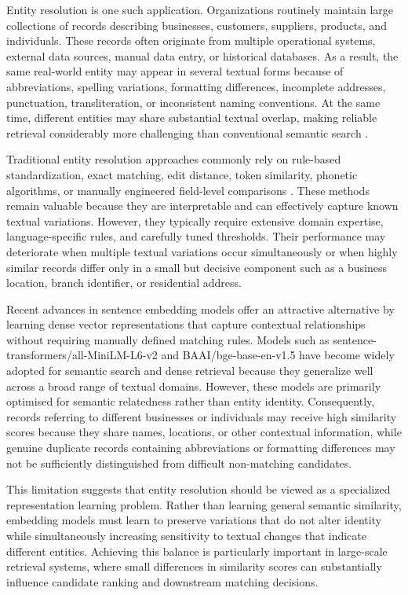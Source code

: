 \documentclass{article}
\begin{document}
Entity resolution is one such application. Organizations routinely maintain large collections of records describing businesses, customers, suppliers, products, and individuals. These records often originate from multiple operational systems, external data sources, manual data entry, or historical databases. As a result, the same real-world entity may appear in several textual forms because of abbreviations, spelling variations, formatting differences, incomplete addresses, punctuation, transliteration, or inconsistent naming conventions. At the same time, different entities may share substantial textual overlap, making reliable retrieval considerably more challenging than conventional semantic search \citep{christen2012}.

Traditional entity resolution approaches commonly rely on rule-based standardization, exact matching, edit distance, token similarity, phonetic algorithms, or manually engineered field-level comparisons \citep{christen2012,elmagarmid2007}. These methods remain valuable because they are interpretable and can effectively capture known textual variations. However, they typically require extensive domain expertise, language-specific rules, and carefully tuned thresholds. Their performance may deteriorate when multiple textual variations occur simultaneously or when highly similar records differ only in a small but decisive component such as a business location, branch identifier, or residential address.

Recent advances in sentence embedding models \citep{reimers2019,xiao2023} offer an attractive alternative by learning dense vector representations that capture contextual relationships without requiring manually defined matching rules. Models such as sentence-transformers/all-MiniLM-L6-v2 and BAAI/bge-base-en-v1.5 have become widely adopted for semantic search and dense retrieval because they generalize well across a broad range of textual domains. However, these models are primarily optimised for semantic relatedness rather than entity identity. Consequently, records referring to different businesses or individuals may receive high similarity scores because they share names, locations, or other contextual information, while genuine duplicate records containing abbreviations or formatting differences may not be sufficiently distinguished from difficult non-matching candidates.

This limitation suggests that entity resolution should be viewed as a specialized representation learning problem. Rather than learning general semantic similarity, embedding models must learn to preserve variations that do not alter identity while simultaneously increasing sensitivity to textual changes that indicate different entities. Achieving this balance is particularly important in large-scale retrieval systems, where small differences in similarity scores can substantially influence candidate ranking and downstream matching decisions.
\end{document}
